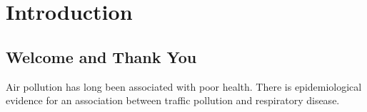 
\chapter{Introduction} %

\label{Chapter1} %


\newcommand{\keyword}[1]{\textbf{#1}}
\newcommand{\tabhead}[1]{\textbf{#1}}
\newcommand{\code}[1]{\texttt{#1}}
\newcommand{\file}[1]{\texttt{\bfseries#1}}
\newcommand{\option}[1]{\texttt{\itshape#1}}


\section{Welcome and Thank You}
Air pollution has long been associated with poor health. There is epidemiological evidence for an association between traffic pollution and respiratory disease. 

